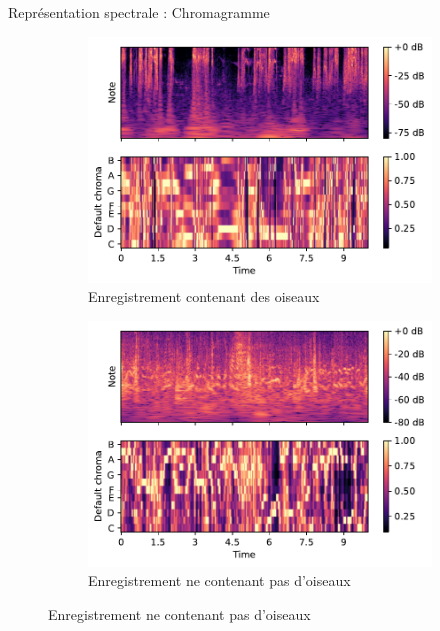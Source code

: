 \documentclass[compress,xcolor=table]{beamer}
\begin{document}
\begin{frame}{Représentation spectrale : Chromagramme}
\begin{figure}[ht]
        \vspace{-0.7cm}

        \begin{subfigure}[b]{0.45\textwidth}
            \centering
            \includegraphics[width=\textwidth]{../images/audio/birds.chromagram.ff1010.pdf}
            \caption{Enregistrement contenant des oiseaux}
            \label{fig:birds.chromagram.ff1010}
        \end{subfigure}
        \hfill
        \begin{subfigure}[b]{0.45\textwidth}
            \centering
            \includegraphics[width=\textwidth]{../images/audio/nobirds.chromagram.ff1010.pdf}
            \caption{Enregistrement ne contenant pas d'oiseaux}
            \label{fig:nobirds.chromagram.ff1010}
        \end{subfigure}
    \end{figure}

\end{frame}
\end{document}
